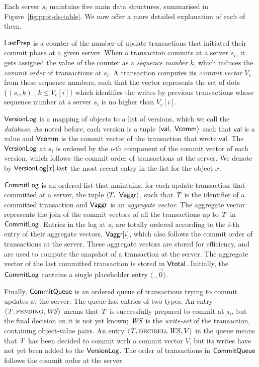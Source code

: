  Each server $s_i$ maintains five main data structures, summarised in Figure~\ref{fig:prot-ds-table}. We now offer a more detailed explanation of each of them.

$\mathsf{LastPrep}$ is a counter of the number of update transactions that initiated their commit phase at a given server. When a transaction commits at a server $s_i$, it gets assigned the value of the counter as a \emph{sequence number} $k$, which induces the \emph{commit order} of transactions at $s_i$. A transaction computes its \emph{commit vector} $V_c$ from these sequence numbers, such that the vector represents the set of dots $\{(s_i, k) \mid k \le V_c[i]\}$ which identifies the writes by previous transactions whose sequence number at a server $s_i$ is no higher than $V_c[i]$.

$\mathsf{VersionLog}$ is a mapping of objects to a list of versions, which we call the \emph{database}. As noted before, each version is a tuple $\langle \mathsf{val},\ \mathsf{Vcomm} \rangle$ such that $\mathsf{val}$ is a value and $\mathsf{Vcomm}$ is the commit vector of the transaction that wrote $\mathsf{val}$. The $\mathsf{VersionLog}$ at $s_i$ is ordered by the $i$-th component of the commit vector of each version, which follows the commit order of transactions at the server. We denote by $\mathsf{VersionLog}[x].{\rm last}$ the most recent entry in the list for the object $x$.

$\mathsf{CommitLog}$ is an ordered list that maintains, for each update transaction that committed at a server, the tuple $\langle T,\ \mathsf{Vaggr} \rangle$, such that $\mathit{T}$ is the identifier of a committed transaction and $\mathsf{Vaggr}$ is an \emph{aggregate vector}. The aggregate vector represents the join of the commit vectors of all the transactions up to $\mathit{T}$ in $\mathsf{CommitLog}$. Entries in the log at $s_i$ are totally ordered according to the $i$-th entry of their aggregate vectors, $\mathsf{Vaggr}[i]$, which also follows the commit order of transactions at the server. These aggregate vectors are stored for efficiency, and are used to compute the snapshot of a transaction at the server. The aggregate vector of the last committed transaction is stored in $\mathsf{Vtotal}$. Initially, the $\mathsf{CommitLog}$ contains a single placeholder entry $\langle \_, \vec{0} \rangle$.

Finally, $\mathsf{CommitQueue}$ is an ordered queue of transactions trying to commit updates at the server. The queue has entries of two types. An entry $\langle \mathit{T}, \text{\sc pending}, \mathit{WS} \rangle$ means that $\mathit{T}$ is successfully prepared to commit at $s_i$, but the final decision on it is not yet known; $\mathit{WS}$ is the \emph{write-set} of the transaction, containing object-value pairs. An entry $\langle \mathit{T}, \text{\sc decided}, \mathit{WS}, V \rangle$ in the queue means that $\mathit{T}$ has been decided to commit with a commit vector $V$, but its writes have not yet been added to the $\mathsf{VersionLog}$. The order of transactions in $\mathsf{CommitQueue}$ follows the commit order at the server.

